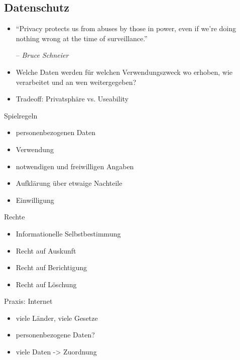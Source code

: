\documentclass[hyperref={colorlinks,linkcolor=white}, utf8]{beamer}
\begin{document}
	\subsection{Datenschutz}
	\begin{frame} 
		\begin{itemize}
			\item{\enquote{Privacy protects us from abuses by those in power, even if we’re doing nothing wrong at the time of surveillance.}
				
				-- \emph{Bruce Schneier}}
			\item Welche Daten werden für welchen Verwendungszweck wo erhoben, wie verarbeitet und an wen weitergegeben?
			\item Tradeoff: Privatsphäre vs. Useability
		\end{itemize}
	\end{frame}
	
	\begin{frame}{Spielregeln}
		\begin{itemize}
			\item personenbezogenen Daten
			\item Verwendung
			\item notwendigen und freiwilligen Angaben
			\item Aufklärung über etwaige Nachteile
			\item Einwilligung
		\end{itemize}
	\end{frame}
	
	\begin{frame}{Rechte}
		\begin{itemize}
			\item Informationelle Selbstbestimmung
			\item Recht auf Auskunft
			\item Recht auf Berichtigung
			\item Recht auf Löschung
		\end{itemize}
	\end{frame}
	
	\begin{frame}{Praxis: Internet}
		\begin{itemize}
			\item viele Länder, viele Gesetze
			\item personenbezogene Daten?
			\item viele Daten -> Zuordnung
		\end{itemize}
	\end{frame}
	
\end{document}
